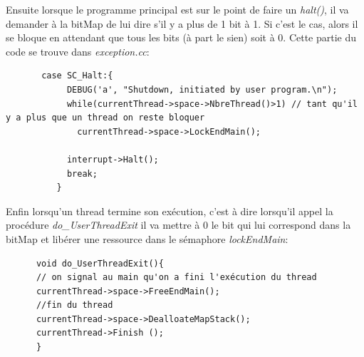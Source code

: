 \documentclass[a4paper,10pt]{report}
\begin{document}
      Ensuite lorsque le programme principal est sur le point de faire un \emph{halt()}, il va demander à la bitMap de lui dire s'il y a plus de 1 bit à 1.
      Si c'est le cas, alors il se bloque en attendant que tous les bits (à part le sien) soit à 0. Cette partie du code se trouve dans \emph{exception.cc}:
      \begin{lstlisting}
       case SC_Halt:{
            DEBUG('a', "Shutdown, initiated by user program.\n");
            while(currentThread->space->NbreThread()>1) // tant qu'il y a plus que un thread on reste bloquer
              currentThread->space->LockEndMain();
            
            interrupt->Halt();
            break;
          }
      \end{lstlisting}

     Enfin lorsqu'un thread termine son exécution, c'est à dire lorsqu'il appel la procédure \emph{do\_UserThreadExit} il va mettre à 0 le bit qui lui
     correspond dans la bitMap et libérer une ressource dans le sémaphore \emph{lockEndMain}:
     
     \begin{lstlisting}
      void do_UserThreadExit(){	
	  // on signal au main qu'on a fini l'exécution du thread
	  currentThread->space->FreeEndMain();
	  //fin du thread
	  currentThread->space->DealloateMapStack();
	  currentThread->Finish ();
      }
     \end{lstlisting}
    
\end{document}
